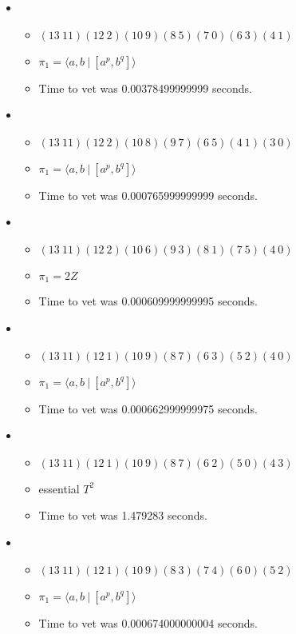 \documentclass{article}
\begin{document}
\begin{itemize}
\begin{itemize}
\end{itemize}
\item \begin{itemize}
      \item $(13\ 11)(12\ 2)(10\ 9)(8\ 5)(7\ 0)(6\ 3)(4\ 1)$
      \item $\pi_1 = \langle a,b\ |\ [a^p,b^q]\rangle$
      \item Time to vet was 0.00378499999999 seconds.
\end{itemize}
\item \begin{itemize}
      \item $(13\ 11)(12\ 2)(10\ 8)(9\ 7)(6\ 5)(4\ 1)(3\ 0)$
      \item $\pi_1 = \langle a,b\ |\ [a^p,b^q]\rangle$
      \item Time to vet was 0.000765999999999 seconds.
\end{itemize}
\item \begin{itemize}
      \item $(13\ 11)(12\ 2)(10\ 6)(9\ 3)(8\ 1)(7\ 5)(4\ 0)$
      \item $\pi_1 =2 Z$
      \item Time to vet was 0.000609999999995 seconds.
\end{itemize}
\item \begin{itemize}
      \item $(13\ 11)(12\ 1)(10\ 9)(8\ 7)(6\ 3)(5\ 2)(4\ 0)$
      \item $\pi_1 = \langle a,b\ |\ [a^p,b^q]\rangle$
      \item Time to vet was 0.000662999999975 seconds.
\end{itemize}
\item \begin{itemize}
      \item $(13\ 11)(12\ 1)(10\ 9)(8\ 7)(6\ 2)(5\ 0)(4\ 3)$
      \item essential $T^2$
      \item Time to vet was 1.479283 seconds.
\end{itemize}
\item \begin{itemize}
      \item $(13\ 11)(12\ 1)(10\ 9)(8\ 3)(7\ 4)(6\ 0)(5\ 2)$
      \item $\pi_1 = \langle a,b\ |\ [a^p,b^q]\rangle$
      \item Time to vet was 0.000674000000004 seconds.
\end{itemize}
\end{itemize}
\end{document}
